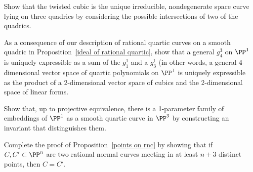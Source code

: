 \begin{exercise}
Show that the twisted cubic is the unique irreducible, nondegenerate space curve lying on three quadrics by considering the possible
intersections of two of the quadrics.
\end{exercise}

\begin{exercise}\label{decomposition of a $g^3_4$}
As a consequence of our description of rational quartic curves on a smooth quadric in Proposition~\ref{ideal of rational quartic},
show that a general $g^3_4$ on $\PP^1$ is uniquely expressible as a sum of the $g_1^1$ and a $g^1_3$
(in other words, a general 4-dimensional vector space of quartic polynomials on $\PP^1$ is uniquely expressible as the product of a 2-dimensional vector space of cubics and the 2-dimensional space of linear forms.
\end{exercise}

\begin{exercise}\label{distinguishing rational quartics}
Show that, up to projective equivalence, there is a 1-parameter family of embeddings of $\PP^1$ as a 
smooth quartic curve in $\PP^3$ 
by constructing an invariant that distinguishes them. 
\end{exercise}

\begin{exercise}\label{Castelnuovo uniqueness}
Complete the proof of Proposition~\ref{points on rnc} by showing that if $C, C' \subset \PP^n$ are two rational normal curves meeting in at least $n+3$ distinct points, then $C = C'$. 
\end{exercise}


